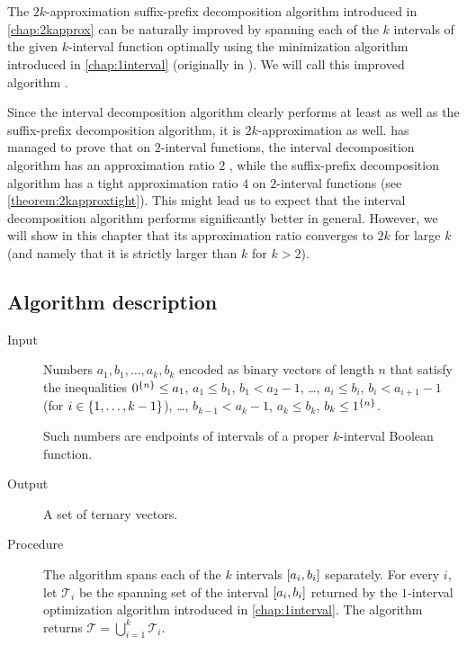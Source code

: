 \chapter{}
\label{chap:betterapprox}

The $2k$-approximation
suffix-prefix decomposition algorithm
introduced in \autoref{chap:2kapprox}
can be naturally improved
by spanning each of the $k$ intervals
of the given $k$-interval function
optimally using the minimization algorithm
introduced in \autoref{chap:1interval}
(originally in \citet{Schieber2005154}).
We will call this improved algorithm
.

Since the interval decomposition algorithm
clearly performs at least as well
as the suffix-prefix decomposition algorithm,
it is $2k$-approximation as well.
\citeauthor{Dubovsky2012} has managed
to prove that on $2$-interval functions,
the interval decomposition algorithm
has an approximation ratio $2$
\citep[p.~39]{Dubovsky2012}, %
while the suffix-prefix decomposition algorithm
has a tight approximation ratio $4$
on $2$-interval functions
(see \autoref{theorem:2kapproxtight}).
This might lead us to expect
that the interval decomposition algorithm
performs significantly better in general.
However,
we will show in this chapter that its approximation ratio
converges to $2k$ for large $k$
(and namely that it is strictly larger than $k$
for $k > 2$).

\section{Algorithm description}


\begin{description}
\item[Input] Numbers $a_1, b_1, \ldots, a_k, b_k$
encoded as binary vectors of length $n$
that satisfy the inequalities
$0^{\{n\}} \leq a_1$,
$a_1 \leq b_1$,
$b_1 < a_2 - 1$,
\ldots,
$a_i \leq b_i$,
$b_i < a_{i+1} - 1$
(for $i \in \{1, \ldots, k-1\}$),
\ldots,
$b_{k-1} < a_k - 1$,
$a_k \leq b_k$,
$b_k \leq 1^{\{n\}}$.

Such numbers are endpoints of intervals
of a proper $k$-interval Boolean function.

\item[Output] A set of ternary vectors.

\item[Procedure]
The algorithm spans each of the $k$ intervals
$[a_i, b_i]$ separately.
For every $i$,
let $\mathcal{T}_i$ be the spanning set of the interval
$[a_i, b_i]$ returned by the $1$-interval
optimization algorithm
introduced in \autoref{chap:1interval}.
The algorithm returns
$\mathcal{T} = \bigcup_{i=1}^k{\mathcal{T}_i}$.
\end{description}

